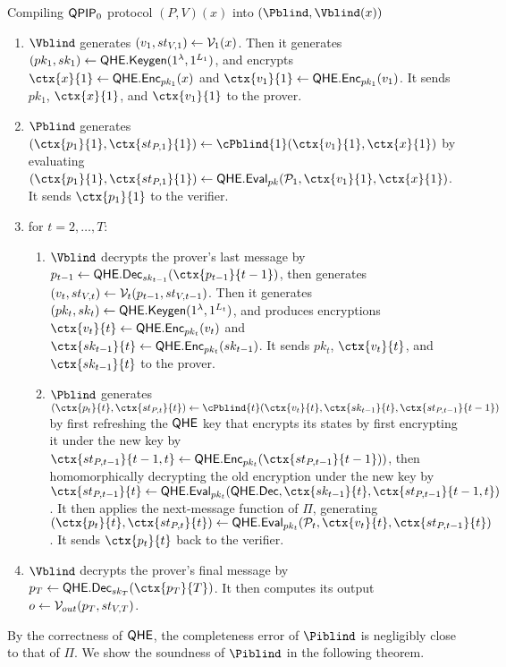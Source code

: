 \begin{protocol}{Compiling $\operatorname{\mathsf{QPIP}}_0$ protocol $(P, V)(x)$ into $(\Pblind, \Vblind(x))$}
	\begin{enumerate}
		\item $\Vblind$ generates $(v_1, st_{V, 1})\leftarrow\mathcal{V}_1(x)$.
			Then it generates $(pk_1, sk_1)\leftarrow\mathsf{QHE.Keygen}(1^\lambda, 1^{L_1})$,
			and encrypts $\ctx{x}{1}\leftarrow\QEnc_{pk_1}(x)$ and $\ctx{v_1}{1}\leftarrow\QEnc_{pk_1}(v_1)$.
			It sends $pk_1$, $\ctx{x}{1}$, and $\ctx{v_1}{1}$ to the prover.
		\item $\Pblind$ generates $(\ctx{p_1}{1}, \ctx{st_{P, 1}}{1})\leftarrow\cPblind{1}(\ctx{v_1}{1}, \ctx{x}{1})$
			by evaluating $(\ctx{p_1}{1}, \ctx{st_{P, 1}}{1})\leftarrow\QEval_{pk}(\cP_1, \ctx{v_1}{1}, \ctx{x}{1})$.
			It sends $\ctx{p_1}{1}$ to the verifier.
		\item for $t=2,\ldots,T$:
		\begin{enumerate}
			\item $\Vblind$ decrypts the prover's last message by $p_{t-1}\leftarrow\QDec_{sk_{t-1}}(\ctx{p_{t-1}}{t-1})$,
				then generates $(v_t, st_{V, t})\leftarrow\mathcal{V}_t(p_{t-1}, st_{V, t-1})$.
				Then it generates $(pk_t, sk_t)\leftarrow\mathsf{QHE.Keygen}(1^\lambda, 1^{L_t})$,
				and produces encryptions $\ctx{v_t}{t}\leftarrow\QEnc_{pk_t}(v_t)$ and $\ctx{sk_{t-1}}{t}\leftarrow\QEnc_{pk_t}(sk_{t-1})$.
				It sends $pk_t$, $\ctx{v_t}{t}$, and $\ctx{sk_{t-1}}{t}$ to the prover.
			\item $\Pblind$ generates $(\ctx{p_t}{t}, \ctx{st_{P, t}}{t})\leftarrow\cPblind{t}(\ctx{v_t}{t}, \ctx{sk_{t-1}}{t}, \ctx{st_{P, t-1}}{t-1})$
				by first refreshing the $\mathsf{QHE}$ key that encrypts its states by
				first encrypting it under the new key by $\ctx{st_{P, t-1}}{t-1, t}\leftarrow\QEnc_{pk_t}(\ctx{st_{P, t-1}}{t-1}))$,
				then homomorphically decrypting the old encryption under the new key by
				$\ctx{st_{P, t-1}}{t}\leftarrow\QEval_{pk_t}(\QDec, \ctx{sk_{t-1}}{t}, \ctx{st_{P, t-1}}{t-1, t})$.
				It then applies the next-message function of $\Pi$, generating
				$(\ctx{p_t}{t}, \ctx{st_{P, t}}{t})\leftarrow\QEval_{pk_t}(\cP_t, \ctx{v_t}{t}, \ctx{st_{P, t-1}}{t})$.
				It sends $\ctx{p_t}{t}$ back to the verifier.
		\end{enumerate}
		\item $\Vblind$ decrypts the prover's final message by $p_T\leftarrow\QDec_{sk_T}(\ctx{p_T}{T})$.
			It then computes its output $o\leftarrow\mathcal{V}_{out}(p_T, st_{V, T})$.
	\end{enumerate}
\end{protocol}

By the correctness of $\mathsf{QHE}$, the completeness error of $\Piblind$ is negligibly close to that of $\Pi$.
We show the soundness of $\Piblind$ in the following theorem.

